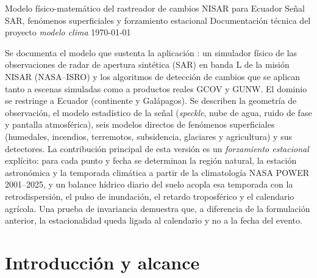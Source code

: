 \documentclass[11pt,a4paper]{article}
\newcommand{\codigo}[1]{\cpcodigo{#1}}
\begin{document}
  {Modelo físico-matemático del rastreador de cambios NISAR para Ecuador}
  {Señal SAR, fenómenos superficiales y forzamiento estacional}
  {Documentación técnica del proyecto \emph{modelo clima}}
  {\today}

\begin{cpcaja}[title=RESUMEN]
Se documenta el modelo que sustenta la aplicación \codigo{app.py}: un simulador físico de las
observaciones de radar de apertura sintética (SAR) en banda L de la misión NISAR (NASA--ISRO) y los
algoritmos de detección de cambios que se aplican tanto a escenas simuladas como a productos reales
GCOV y GUNW. El dominio se restringe a Ecuador (continente y Galápagos). Se describen la geometría de
observación, el modelo estadístico de la señal (\emph{speckle}, nube de agua, ruido de fase y pantalla
atmosférica), seis modelos directos de fenómenos superficiales (humedales, incendios, terremotos,
subsidencia, glaciares y agricultura) y sus detectores. La contribución principal de esta versión es un
\emph{forzamiento estacional} explícito: para cada punto y fecha se determinan la región natural, la
estación astronómica y la temporada climática a partir de la climatología NASA POWER 2001--2025, y un
balance hídrico diario del suelo acopla esa temporada con la retrodispersión, el pulso de inundación, el
retardo troposférico y el calendario agrícola. Una prueba de invariancia demuestra que, a diferencia de
la formulación anterior, la estacionalidad queda ligada al calendario y no a la fecha del evento.
\end{cpcaja}

\tableofcontents
\clearpage

\section{Introducción y alcance}
\end{document}
